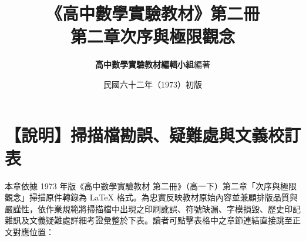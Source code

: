 \documentclass[a4paper,12pt,twoside]{article}
\title{\LARGE\textbf{《高中數學實驗教材》第二冊}\\[0.5em] \Large\textbf{第二章\quad 次序與極限觀念}}
\author{\textbf{高中數學實驗教材編輯小組}\quad 編著}
\date{民國六十二年（1973）初版}
\begin{document}
\maketitle
\thispagestyle{firstpage}

\section*{【說明】掃描檔勘誤、疑難處與文義校訂表}
\label{sec:errata_notes}

本章依據 1973 年版《高中數學實驗教材 第二冊》（高一下）第二章「次序與極限觀念」掃描原件轉錄為 \LaTeX{} 格式。為忠實反映教材原始內容並兼顧排版品質與嚴謹性，依作業規範將掃描檔中出現之印刷訛誤、符號缺漏、字模損毀、歷史印記雜訊及文義疑難處詳細考證彙整於下表。讀者可點擊表格中之章節連結直接跳至正文對應位置：
\end{document}
